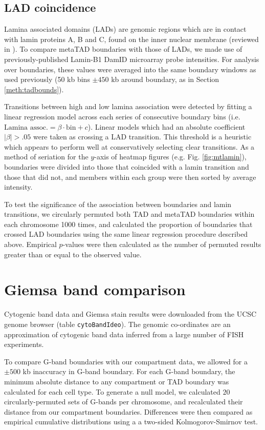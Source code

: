 \documentclass[a4paper,11pt,oneside]{book}
\begin{document}
\subsection{LAD coincidence}\label{meth:metalad}

Lamina associated domains (LADs) are genomic regions which are in contact with lamin proteins A, B and C, found on the inner nuclear membrane (reviewed in ). To compare metaTAD boundaries with those of LADs, we made use of previously-published Lamin-B1 DamID microarray probe intensities.\cite{Peric-Hupkes2010} For analysis over boundaries, these values were averaged into the same boundary windows as used previously (50 kb bins $\pm450$ kb around boundary, as in Section \ref{meth:tadbounds}). 

Transitions between high and low lamina association were detected by fitting a linear regression model across each series of consecutive boundary bins (i.e. $\textrm{Lamina assoc.}=\beta\cdot\textrm{bin} + c$). Linear models which had an absolute coefficient $|\beta| >.05$ were taken as crossing a LAD transition. This threshold is a heuristic which appears to perform well at conservatively selecting clear transitions. As a method of seriation for the $y$-axis of heatmap figures (e.g. Fig. \ref{fig:mtlamin}), boundaries were divided into those that coincided with a lamin transition and those that did not, and members within each group were then sorted by average intensity. 

To test the significance of the association between boundaries and lamin transitions, we circularly permuted both TAD and metaTAD boundaries within each chromosome 1000 times, and calculated the proportion of boundaries that crossed LAD boundaries using the same linear regression procedure described above. Empirical $p$-values were then calculated as the number of permuted results greater than or equal to the observed value.

\section{Giemsa band comparison}\label{giemsa-band-comparison}

Cytogenic band data and Giemsa stain results were downloaded from the
UCSC genome browser (table \texttt{cytoBandIdeo}). The genomic
co-ordinates are an approximation of cytogenic band data inferred from a
large number of FISH experiments.\citep{Furey2003}

To compare G-band boundaries with our compartment data, we allowed for a
$\pm 500$ kb inaccuracy in G-band boundary. For each G-band boundary,
the minimum absolute distance to any compartment or TAD boundary was
calculated for each cell type. To generate a null model, we calculated $20$ circularly-permuted sets of G-bands per chromosome, and recalculated their distance from our compartment boundaries. Differences were then compared as empirical cumulative distributions using a a two-sided Kolmogorov-Smirnov test.
\end{document}
